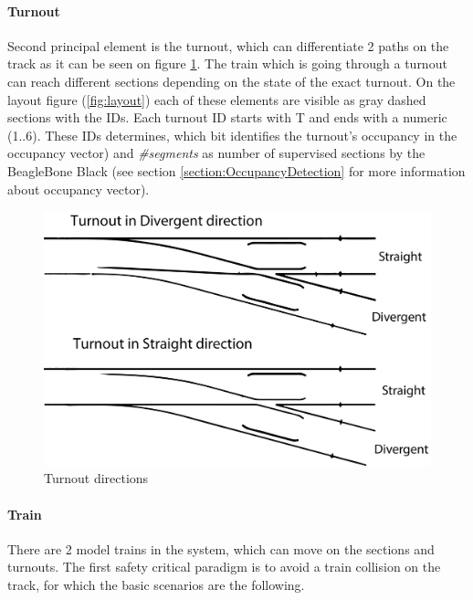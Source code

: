 \paragraph{Turnout}
Second principal element is the turnout, which can differentiate 2 paths on the track as it can be seen on figure \ref{fig:turnoutDir}. The train which is going through a turnout can reach different sections depending on the state of the exact turnout. On the layout figure (\ref{fig:layout}) each of these elements are visible as gray dashed sections with the IDs. Each turnout ID starts with T and ends with a numeric (1..6). These IDs determines, which bit identifies the turnout's occupancy in the occupancy vector) and \textit{\#segments} as number of supervised sections by the BeagleBone Black (see section \ref{section:OccupancyDetection} for more information about occupancy vector).
\begin{figure}[!h]
	\centering
	\includegraphics[width=150mm]{figures/modes3/turnout.png}
	\caption{Turnout directions}
	\label{fig:turnoutDir}
\end{figure}

\paragraph{Train} \label{par:trainScenarios}
There are 2 model trains in the system, which can move on the sections and turnouts. The first safety critical paradigm is to avoid a train collision on the track, for which the basic scenarios are the following. 


